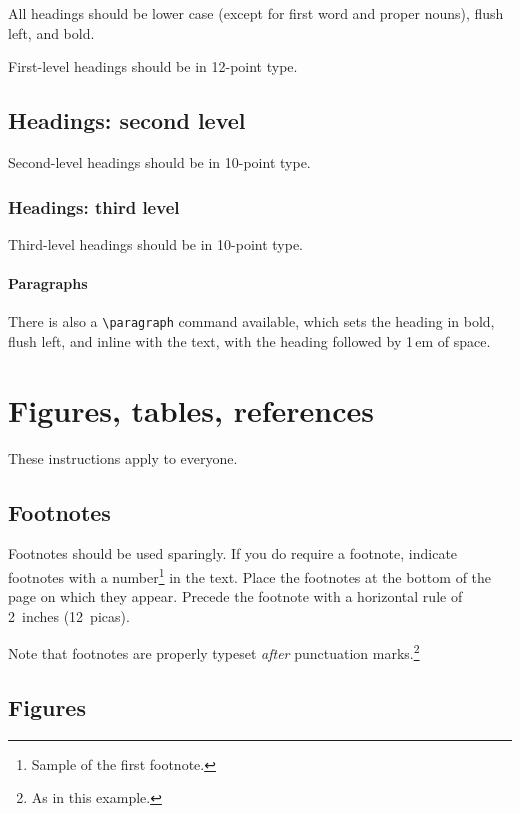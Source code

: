\documentclass{article}
\begin{document}
All headings should be lower case (except for first word and proper nouns),
flush left, and bold.


First-level headings should be in 12-point type.


\subsection{Headings: second level}


Second-level headings should be in 10-point type.


\subsubsection{Headings: third level}


Third-level headings should be in 10-point type.


\paragraph{Paragraphs}


There is also a \verb+\paragraph+ command available, which sets the heading in
bold, flush left, and inline with the text, with the heading followed by 1\,em
of space.


\section{Figures, tables, references}
\label{others}


These instructions apply to everyone.


\subsection{Footnotes}


Footnotes should be used sparingly.  If you do require a footnote, indicate
footnotes with a number\footnote{Sample of the first footnote.} in the
text. Place the footnotes at the bottom of the page on which they appear.
Precede the footnote with a horizontal rule of 2~inches (12~picas).


Note that footnotes are properly typeset \emph{after} punctuation
marks.\footnote{As in this example.}


\subsection{Figures}
\end{document}
